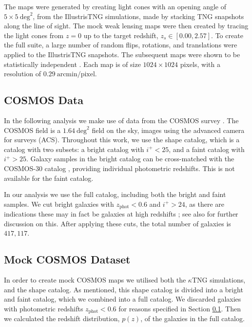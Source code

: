 \documentclass[fleqn,usenatbib]{mnras}
\begin{document}
The maps were generated by creating light cones with an opening angle of $5 \times 5 \: \text{deg}^2$, 
from the IllustrisTNG simulations, made by stacking TNG snapshots along the line of sight. 
The mock weak lensing maps were then created by tracing the light cones from $z=0$ up to the target redshift, 
$z_s \in [0.00, 2.57]$. To create the full suite, a large number of random flips, rotations, and translations 
were applied to the IllustrisTNG snapshots. The subsequent maps were shown to be statistically independent \citep{osato2021kappatng}. 
Each map is of size $1024 \times 1024$ pixels, with a resolution 
of $0.29 \: \text{arcmin/pixel}$. 

\subsection{COSMOS Data}\label{sec:cosmos_data}

In the following analysis we make use of data from the COSMOS survey \citep{scoville2007cosmos}. The 
COSMOS field is a $1.64 \: \text{deg}^2$ field on the sky, images using the advanced camera for surveys (ACS). 
Throughout this work, we use the \citet{schrabback2010evidence} shape catalog, which is a 
catalog with two subsets: a bright catalog with $i^+ < 25$, and a faint catalog with $i^+ > 25$. Galaxy samples in the bright catalog can be cross-matched with the COSMOS-30 catalog \citep{ilbert2008cosmos}, 
providing individual photometric redshifts. This is not available for the faint catalog.

In our analysis we use the full catalog, including both the bright and faint samples. We cut bright galaxies with 
$z_{\text{phot}} < 0.6$ and $i^+ > 24$, as there are indications these may in fact be galaxies at 
high redshifts \citep{schrabback2010evidence}; see also \citet{remy2023probabilistic} for further discussion on this. 
After applying these cuts, the total number of galaxies is $417,117$.

\subsection{Mock COSMOS Dataset}\label{subsec:mock_maps}

In order to create mock COSMOS maps we utilised both the $\kappa$TNG simulations, and the 
\citet{schrabback2010evidence} shape catalog. As mentioned, this shape catalog is divided into a 
bright and faint catalog, which we combined into a full catalog. We discarded galaxies with photometric 
redshifts $z_{\text{phot}} < 0.6$ for reasons specified in Section \ref{sec:cosmos_data}. Then we calculated 
the redshift distribution, $p(z)$, of the galaxies in the full catalog.
\end{document}
